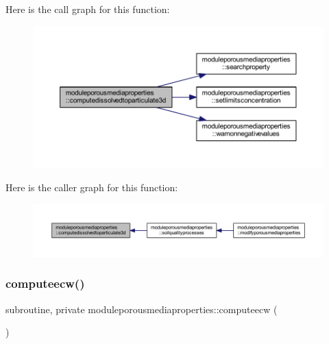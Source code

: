 Here is the call graph for this function\+:\nopagebreak
\begin{figure}[H]
\begin{center}
\leavevmode
\includegraphics[width=350pt]{namespacemoduleporousmediaproperties_a2438c1ae6e14a9ddbc08eda6cd410daf_cgraph}
\end{center}
\end{figure}
Here is the caller graph for this function\+:\nopagebreak
\begin{figure}[H]
\begin{center}
\leavevmode
\includegraphics[width=350pt]{namespacemoduleporousmediaproperties_a2438c1ae6e14a9ddbc08eda6cd410daf_icgraph}
\end{center}
\end{figure}
\mbox{\label{namespacemoduleporousmediaproperties_a32b1336499ea5a5ca4e733054acee536}} 
\subsubsection{\texorpdfstring{computeecw()}{computeecw()}}
{\footnotesize\ttfamily subroutine, private moduleporousmediaproperties\+::computeecw (\begin{DoxyParamCaption}{ }\end{DoxyParamCaption})\hspace{0.3cm}{\ttfamily [private]}}

